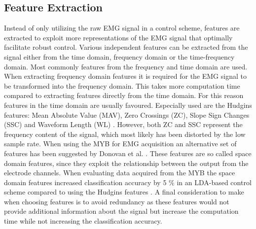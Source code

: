 \subsection{Feature Extraction}
Instead of only utilizing the raw EMG signal in a control scheme, features are extracted to exploit more representations of the EMG signal that optimally facilitate robust control. Various independent features can be extracted from the signal either from the time domain, frequency domain or the time-frequency domain. Most commonly features from the frequency and time domain are used. When extracting frequency domain features it is required for the EMG signal to be transformed into the frequency domain. This takes more computation time compared to extracting features directly from the time domain. For this reason features in the time domain are usually favoured. \cite{Phiny2012} Especially used are the Hudgins features: Mean Absolute Value (MAV), Zero Crossings (ZC), Slope Sign Changes (SSC) and Waveform Length (WL) \cite{Hudgins1993}. However, both ZC and SSC represent the frequency content of the signal, which most likely has been distorted by the low sample rate. When using the MYB for EMG acquisition an alternative set of features has been suggested by Donovan et al. \cite{Donovan2017}. These features are so called space domain features, since they exploit the relationship between the output from the electrode channels. When evaluating data acquired from the MYB the space domain features increased classification accuracy by 5 \% in an LDA-based control scheme compared to using the Hudgins features \cite{Donovan2017}. A final consideration to make when choosing features is to avoid redundancy as these features would not provide additional information about the signal but increase the computation time while not increasing the classification accuracy.    

